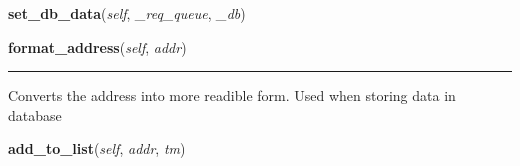     \vspace{0.5ex}

\hspace{.8\funcindent}\begin{boxedminipage}{\funcwidth}

    \raggedright \textbf{set\_db\_data}(\textit{self}, \textit{\_req\_queue}, \textit{\_db})

\setlength{\parskip}{2ex}
\setlength{\parskip}{1ex}
    \end{boxedminipage}

    \label{sensor_thread:Sensor:format_address}

    \vspace{0.5ex}

\hspace{.8\funcindent}\begin{boxedminipage}{\funcwidth}

    \raggedright \textbf{format\_address}(\textit{self}, \textit{addr})

    \vspace{-1.5ex}

    \rule{\textwidth}{0.5\fboxrule}
\setlength{\parskip}{2ex}
    Converts the address into more readible form. Used when storing data in
    database

\setlength{\parskip}{1ex}
    \end{boxedminipage}

    \label{sensor_thread:Sensor:add_to_list}

    \vspace{0.5ex}

\hspace{.8\funcindent}\begin{boxedminipage}{\funcwidth}

    \raggedright \textbf{add\_to\_list}(\textit{self}, \textit{addr}, \textit{tm})

\setlength{\parskip}{2ex}
\setlength{\parskip}{1ex}
    \end{boxedminipage}

    \label{sensor_thread:Sensor:remove_from_list}

